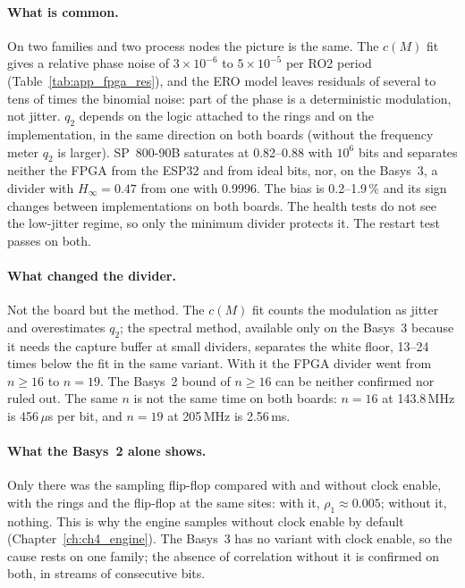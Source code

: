 \paragraph{What is common.} On two families and two process nodes the
picture is the same. The $c(M)$ fit gives a relative phase noise of
$3\times10^{-6}$ to $5\times10^{-5}$ per RO2 period
(Table~\ref{tab:app_fpga_res}), and the \ac{ERO} model leaves
residuals of several to tens of times the binomial noise: part of the
phase is a deterministic modulation, not jitter. $q_2$ depends on the logic
attached to the rings and on the implementation, in the same direction on
both boards (without the frequency meter $q_2$ is larger). SP~800-90B
saturates at 0.82--0.88 with $10^6$ bits and separates neither the
\ac{FPGA} from the ESP32 and from ideal bits, nor, on the Basys~3, a
divider with $H_\infty = 0.47$ from one with 0.9996. The bias is
0.2--1.9\,\% and its sign changes between implementations on both boards.
The health tests do not see the low-jitter regime, so only the minimum
divider protects it. The restart test passes on both.

\paragraph{What changed the divider.} Not the board but the method. The
$c(M)$ fit counts the modulation as jitter and overestimates $q_2$; the
spectral method, available only on the Basys~3 because it needs the
capture buffer at small dividers, separates the white floor, 13--24 times
below the fit in the same variant. With it the \ac{FPGA} divider went from
$n \ge 16$ to $n = 19$. The Basys~2 bound of $n \ge 16$ can be neither
confirmed nor ruled out. The same $n$ is not the same time on both boards:
$n = 16$ at 143.8\,MHz is 456\,$\mu$s per bit, and $n = 19$ at 205\,MHz
is 2.56\,ms.

\paragraph{What the Basys~2 alone shows.} Only there was the sampling
flip-flop compared with and without clock enable, with the rings and the
flip-flop at the same sites: with it, $\rho_1 \approx 0.005$; without it,
nothing. This is why the engine samples without clock enable by default
(Chapter~\ref{ch:ch4_engine}). The Basys~3 has no variant with clock enable,
so the cause rests on one family; the absence of correlation without it is
confirmed on both, in streams of consecutive bits.


